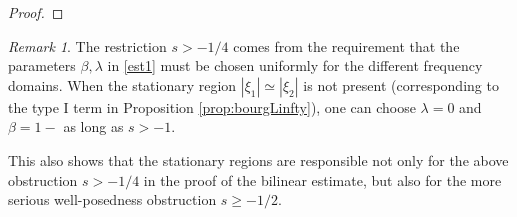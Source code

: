 \documentclass[%
11pt,  reqno]{amsart}
\newcommand{\fia}{\mathbbm{1}_{|\Phi-\alpha|<M}}
\newcommand{\jap}[1]{\langle #1 \rangle}
\newcommand{\5}{\textup{V}}
\newcommand{\ind}{\mathbbm 1}
\newcommand{\les}{\lesssim}
\theoremstyle{remark}
\newtheorem{remark}[theorem]{Remark}
\newcommand{\al}{\alpha}
\numberwithin{equation}{section}
\numberwithin{theorem}{section}
\begin{document}
\begin{proof}




\end{proof}



\begin{remark}
    The restriction $s>-1/4$ comes from the requirement that the parameters $\beta,\lambda$ in \eqref{est1} must be chosen uniformly for the different frequency domains. When the stationary region $|\xi_1|\simeq |\xi_2|$ is not present (corresponding to the type I term in Proposition \ref{prop:bourgLinfty}), one can choose $\lambda=0$ and $\beta=1-$ as long as $s>-1$.

    This also shows that the stationary regions are responsible not only for the above obstruction $s>-1/4$ in the proof of the bilinear estimate, but also for the more serious well-posedness obstruction $s\ge -1/2$.

\end{remark}


\end{document}
